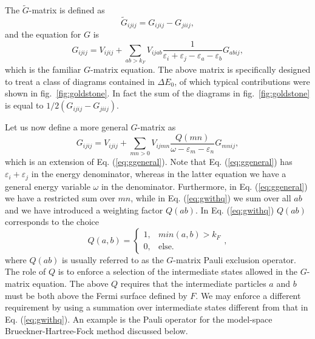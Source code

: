 \documentclass[%
oneside,                 %
final,                   %
10pt]{article}
\begin{document}
The $\tilde{G}$-matrix  is defined as
\begin{equation}
    \tilde{G}_{ijij}=G_{ijij}-G_{jiij},
\end{equation}
and the equation for $G$ is
\begin{equation}
      G_{ijij}=V_{ijij}
      +\sum_{ab>k_F}V_{ijab}\frac{1}
      {\varepsilon_i+\varepsilon_j-\varepsilon_a-\varepsilon_b}
      G_{abij},
      \label{eq:ggeneral}
\end{equation}
which is the familiar $G$-matrix equation. The above
matrix is specifically designed to treat a class of diagrams
contained in $\Delta E_0$, of which typical contributions
were shown in fig.~\ref{fig:goldstone}. In fact the sum of the diagrams
in fig.~\ref{fig:goldstone} is equal to $1/2(G_{ijij}-G_{jiij})$.

Let us now define a more general $G$-matrix as
\begin{equation}
      G_{ijij}=V_{ijij}
      +\sum_{mn>0}V_{ijmn}\frac{Q(mn)}
      {\omega -\varepsilon_m-\varepsilon_n}
      G_{mnij},
      \label{eq:gwithq}
\end{equation}
which is an extension of Eq. (\ref{eq:ggeneral}). Note that 
Eq. (\ref{eq:ggeneral}) has
$\varepsilon_i+\varepsilon_j$ in the energy denominator, whereas
in the latter equation we have a general energy variable $\omega$
in the denominator. Furthermore, in Eq. (\ref{eq:ggeneral})
we have a restricted
sum over $mn$, while in Eq. (\ref{eq:gwithq})
we sum over all $ab$ and we have
introduced a weighting factor $Q(ab)$. In Eq. (\ref{eq:gwithq}) $Q(ab)$
corresponds to the choice
\begin{equation}
   Q(a , b ) =
    \left\{\begin{array}{cc}1,&min(a ,b ) > k_F\\
    0,&\mathrm{else}.\end{array}\right. ,
\end{equation}
where $Q(ab)$ is usually referred to as the $G$-matrix Pauli
exclusion operator. The role of $Q$ is to enforce a selection
of the intermediate states allowed in the $G$-matrix equation. The above
$Q$ requires that the intermediate particles $a$ and $b$
must be both above the Fermi surface defined by $F$. We may enforce
a different requirement by using a summation over intermediate states
different from that in Eq. (\ref{eq:gwithq}).
An example is the Pauli operator
for the model-space Brueckner-Hartree-Fock method discussed below.
\end{document}
